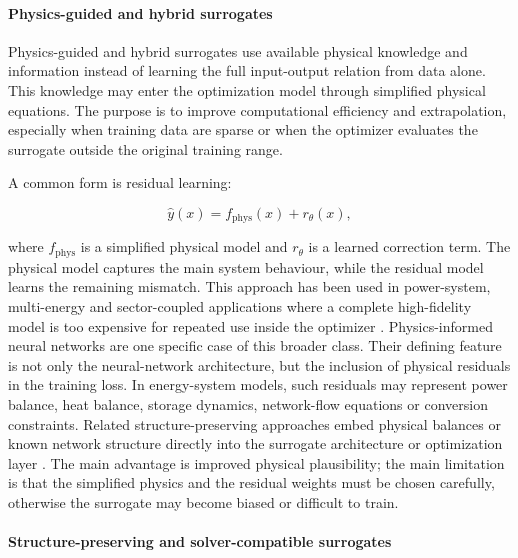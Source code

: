 \documentclass[final,5p,times,twocolumn]{elsarticle}
\begin{document}
\paragraph{Physics-guided and hybrid surrogates}

Physics-guided and hybrid surrogates use available physical knowledge
and information instead of learning the full input-output relation from
data alone. This knowledge may enter the optimization model through
simplified physical equations. The purpose is to improve computational
efficiency and extrapolation, especially when training data are sparse
or when the optimizer evaluates the surrogate outside the original
training range.

A common form is residual learning:

$$\begin{equation}
 \hat{y}(x) = f_{\mathrm{phys}}(x) + r_{\theta}(x),
\end{equation}$$

where $f_{\mathrm{phys}}$ is a simplified physical model and
$r_{\theta}$ is a learned correction term. The physical model captures
the main system behaviour, while the residual model learns the remaining
mismatch. This approach has been used in power-system, multi-energy and
sector-coupled applications where a complete high-fidelity model is too
expensive for repeated use inside the optimizer
\cite{Park2019,Liu20223726,Chen2023657,Liu20222679,Ren2024,Jalving2023,Zheng20231907}.
Physics-informed neural networks are one specific case of this broader
class. Their defining feature is not only the neural-network
architecture, but the inclusion of physical residuals in the training
loss. In energy-system models, such residuals may represent power
balance, heat balance, storage dynamics, network-flow equations or
conversion constraints. Related structure-preserving approaches embed
physical balances or known network structure directly into the
surrogate architecture or optimization layer
\cite{Park2019,Liu20223726,Chen2023657,Liu20242534}.
The main advantage is improved physical plausibility; the main
limitation is that the simplified physics and the residual weights must
be chosen carefully, otherwise the surrogate may become biased or
difficult to train.

\paragraph{Structure-preserving and solver-compatible surrogates}
\label{sec:tax:structured}
\end{document}
